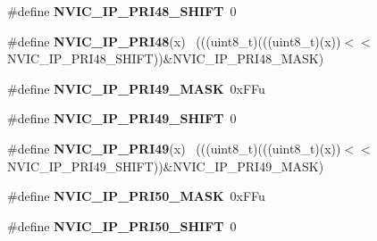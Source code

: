 \begin{DoxyCompactItemize}
\item 
\hypertarget{group___n_v_i_c___register___masks_gaa2df6c28d8516d3465126febad2be9f8}{}\#define {\bfseries N\+V\+I\+C\+\_\+\+I\+P\+\_\+\+P\+R\+I48\+\_\+\+S\+H\+I\+F\+T}~0\label{group___n_v_i_c___register___masks_gaa2df6c28d8516d3465126febad2be9f8}

\item 
\hypertarget{group___n_v_i_c___register___masks_gaf61009f8945664ceadd9731181afcda2}{}\#define {\bfseries N\+V\+I\+C\+\_\+\+I\+P\+\_\+\+P\+R\+I48}(x)                                              ~(((uint8\+\_\+t)(((uint8\+\_\+t)(x))$<$$<$N\+V\+I\+C\+\_\+\+I\+P\+\_\+\+P\+R\+I48\+\_\+\+S\+H\+I\+F\+T))\&N\+V\+I\+C\+\_\+\+I\+P\+\_\+\+P\+R\+I48\+\_\+\+M\+A\+S\+K)\label{group___n_v_i_c___register___masks_gaf61009f8945664ceadd9731181afcda2}

\item 
\hypertarget{group___n_v_i_c___register___masks_ga666a721ff853fd0e203762c58b6ee052}{}\#define {\bfseries N\+V\+I\+C\+\_\+\+I\+P\+\_\+\+P\+R\+I49\+\_\+\+M\+A\+S\+K}~0x\+F\+Fu\label{group___n_v_i_c___register___masks_ga666a721ff853fd0e203762c58b6ee052}

\item 
\hypertarget{group___n_v_i_c___register___masks_gaaa410b281055ab3c731186a2b6be80ef}{}\#define {\bfseries N\+V\+I\+C\+\_\+\+I\+P\+\_\+\+P\+R\+I49\+\_\+\+S\+H\+I\+F\+T}~0\label{group___n_v_i_c___register___masks_gaaa410b281055ab3c731186a2b6be80ef}

\item 
\hypertarget{group___n_v_i_c___register___masks_ga0f724940ab5fa7bb7bd9880f0625d329}{}\#define {\bfseries N\+V\+I\+C\+\_\+\+I\+P\+\_\+\+P\+R\+I49}(x)                                              ~(((uint8\+\_\+t)(((uint8\+\_\+t)(x))$<$$<$N\+V\+I\+C\+\_\+\+I\+P\+\_\+\+P\+R\+I49\+\_\+\+S\+H\+I\+F\+T))\&N\+V\+I\+C\+\_\+\+I\+P\+\_\+\+P\+R\+I49\+\_\+\+M\+A\+S\+K)\label{group___n_v_i_c___register___masks_ga0f724940ab5fa7bb7bd9880f0625d329}

\item 
\hypertarget{group___n_v_i_c___register___masks_gabc74a652c868ef97825bab3e66f3ef0c}{}\#define {\bfseries N\+V\+I\+C\+\_\+\+I\+P\+\_\+\+P\+R\+I50\+\_\+\+M\+A\+S\+K}~0x\+F\+Fu\label{group___n_v_i_c___register___masks_gabc74a652c868ef97825bab3e66f3ef0c}

\item 
\hypertarget{group___n_v_i_c___register___masks_ga903c4a3518564d6124eedcec8a816dbd}{}\#define {\bfseries N\+V\+I\+C\+\_\+\+I\+P\+\_\+\+P\+R\+I50\+\_\+\+S\+H\+I\+F\+T}~0\label{group___n_v_i_c___register___masks_ga903c4a3518564d6124eedcec8a816dbd}


\end{DoxyCompactItemize}
